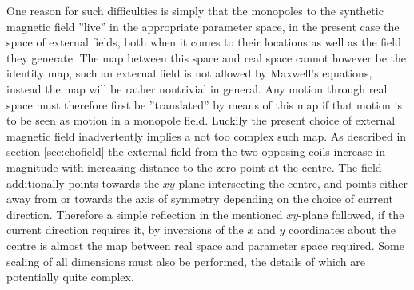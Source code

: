 \documentclass[main.tex]{subfiles}
\begin{document}
One reason for such difficulties is simply that the monopoles to the synthetic magnetic
field ''live'' in the appropriate parameter space, in the present case the space of
external fields, both when it comes to their locations as
well as the field they generate. 
The map between this space and real space cannot however be  the identity map, such an external
field is not allowed by Maxwell's equations,  instead the map will be rather nontrivial in general.
Any motion through real space must therefore first be ''translated'' by means of this map
if that motion is to be seen as motion in a monopole field. Luckily the present choice of
external magnetic field inadvertently implies a not too complex such map. As described in
section \ref{sec:chofield} the external field from the two opposing coils increase in
magnitude with increasing distance to the zero-point at the centre. The field additionally
points towards the \(xy\)-plane intersecting the centre, and points either away
from or towards the axis of symmetry depending on the choice of current direction.
Therefore a simple reflection in the mentioned \(xy\)-plane followed, if the current
direction requires it, by inversions of the \(x\) and \(y\) coordinates about the centre is
almost the map between real space and parameter space required. Some scaling of all
dimensions must also be performed, the details of which are potentially quite complex.
\end{document}
